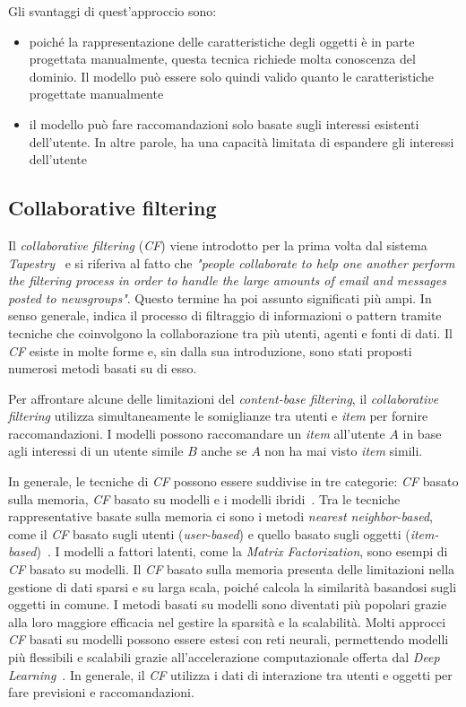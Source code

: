 Gli svantaggi di quest'approccio sono:
\begin{itemize}
    \item poiché la rappresentazione delle caratteristiche degli oggetti è in parte progettata manualmente, questa tecnica richiede molta conoscenza del dominio. Il modello può essere solo quindi valido quanto le caratteristiche progettate manualmente
    \item il modello può fare raccomandazioni solo basate sugli interessi esistenti dell'utente. In altre parole, ha una capacità limitata di espandere gli interessi dell'utente
\end{itemize}

\subsection{Collaborative filtering}
Il \textit{collaborative filtering} (\textit{CF}) viene introdotto per la prima volta dal sistema \textit{Tapestry}~\cite{Tapestry} e si riferiva al fatto che \textit{"people collaborate to help one another perform the filtering process in order to handle the large amounts of email and messages posted to newsgroups"}. Questo termine ha poi assunto significati più ampi. In senso generale, indica il processo di filtraggio di informazioni o pattern tramite tecniche che coinvolgono la collaborazione tra più utenti, agenti e fonti di dati. Il \textit{CF} esiste in molte forme e, sin dalla sua introduzione, sono stati proposti numerosi metodi basati su di esso.

Per affrontare alcune delle limitazioni del \textit{content-base filtering}, il \textit{collaborative filtering} utilizza simultaneamente le somiglianze tra utenti e \textit{item} per fornire raccomandazioni. I modelli possono raccomandare un \textit{item} all'utente $A$ in base agli interessi di un utente simile $B$ anche se $A$ non ha mai visto \textit{item} simili.

In generale, le tecniche di \textit{CF} possono essere suddivise in tre categorie: \textit{CF} basato sulla memoria, \textit{CF} basato su modelli e i modelli ibridi~\cite{Su}. Tra le tecniche rappresentative basate sulla memoria ci sono i metodi \textit{nearest neighbor-based}, come il \textit{CF} basato sugli utenti (\textit{user-based}) e quello basato sugli oggetti (\textit{item-based})~\cite{Sarwar}. I modelli a fattori latenti, come la \textit{Matrix Factorization}, sono esempi di \textit{CF} basato su modelli. Il \textit{CF} basato sulla memoria presenta delle limitazioni nella gestione di dati sparsi e su larga scala, poiché calcola la similarità basandosi sugli oggetti in comune. I metodi basati su modelli sono diventati più popolari grazie alla loro maggiore efficacia nel gestire la sparsità e la scalabilità. Molti approcci \textit{CF} basati su modelli possono essere estesi con reti neurali, permettendo modelli più flessibili e scalabili grazie all'accelerazione computazionale offerta dal \textit{Deep Learning}~\cite{Zhang}. In generale, il \textit{CF} utilizza i dati di interazione tra utenti e oggetti per fare previsioni e raccomandazioni.


